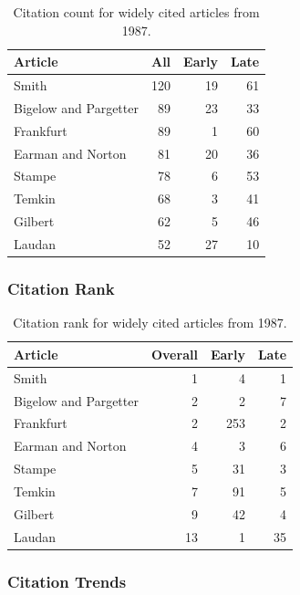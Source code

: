 \documentclass[
  10pt,
  letterpaper,
  DIV=11,
  numbers=noendperiod,
  twoside]{scrartcl}
\begin{document}
\begin{longtable}[]{@{}lrrr@{}}

\caption{\label{tbl-citation-count-1987}Citation count for widely cited
articles from 1987.}

\tabularnewline

\toprule\noalign{}
Article & All & Early & Late \\
\midrule\noalign{}
\endhead
\bottomrule\noalign{}
\endlastfoot
Smith & 120 & 19 & 61 \\
Bigelow and Pargetter & 89 & 23 & 33 \\
Frankfurt & 89 & 1 & 60 \\
Earman and Norton & 81 & 20 & 36 \\
Stampe & 78 & 6 & 53 \\
Temkin & 68 & 3 & 41 \\
Gilbert & 62 & 5 & 46 \\
Laudan & 52 & 27 & 10 \\

\end{longtable}

\subsubsection*{Citation Rank}\label{sec-rank-1987}

\begin{longtable}[]{@{}lrrr@{}}

\caption{\label{tbl-citation-rank-1987}Citation rank for widely cited
articles from 1987.}

\tabularnewline

\toprule\noalign{}
Article & Overall & Early & Late \\
\midrule\noalign{}
\endhead
\bottomrule\noalign{}
\endlastfoot
Smith & 1 & 4 & 1 \\
Bigelow and Pargetter & 2 & 2 & 7 \\
Frankfurt & 2 & 253 & 2 \\
Earman and Norton & 4 & 3 & 6 \\
Stampe & 5 & 31 & 3 \\
Temkin & 7 & 91 & 5 \\
Gilbert & 9 & 42 & 4 \\
Laudan & 13 & 1 & 35 \\

\end{longtable}

\subsubsection*{Citation Trends}\label{sec-trends-1987}
\end{document}
